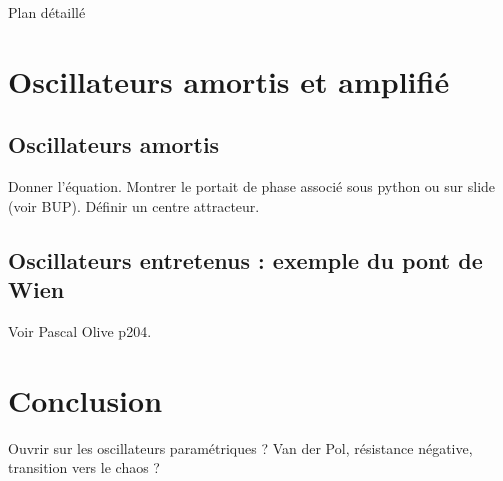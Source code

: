 \begin{reportBlock}{Plan détaillé}
  \section{Oscillateurs amortis et amplifié}
  
  \subsection{Oscillateurs amortis}
  Donner l'équation. Montrer le portait de phase associé sous python ou sur slide (voir BUP). Définir un centre attracteur.\\
  
  \subsection{Oscillateurs entretenus : exemple du pont de Wien}
  Voir Pascal Olive p204.
  \section*{Conclusion}
  Ouvrir sur les oscillateurs paramétriques ? Van der Pol, résistance négative, transition vers le chaos ?

  


\end{reportBlock}